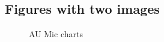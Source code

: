 \subsection{Figures with two images}

\begin{figure}[ht!]
    \centering
    \begin{subfigure}
        \centering
    \end{subfigure}
    \hfill
    \begin{subfigure}
        \centering
    \end{subfigure}
    \caption{AU Mic charts}
    \label{charts-au-mic}
\end{figure}

